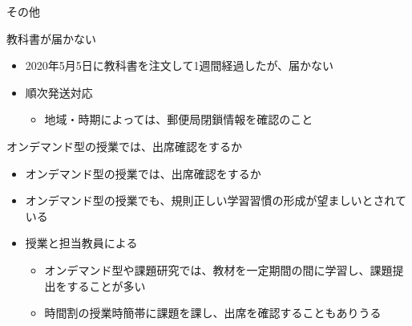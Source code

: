 \documentclass[a4j,10pt]{jsarticle}
\def\lthtmlcheckvsize{\ifdim\ht\sizebox<\vsize 
  \ifdim\wd\sizebox<\hsize\expandafter\hfill\fi \expandafter\vfill
  \else\expandafter\vss\fi}%
\begin{document}
{\newpage\clearpage
{}%
\begin{frame}[label={sec:org821c684},fragile]{その他}
\begin{block}{教科書が届かない}
\begin{itemize}
\item 2020年5月5日に教科書を注文して1週間経過したが、届かない
\item 順次発送対応
\begin{itemize}
\item 地域・時期によっては、郵便局閉鎖情報を確認のこと
\end{itemize}
\end{itemize}
\end{block}
\par
\begin{block}{オンデマンド型の授業では、出席確認をするか}
\begin{itemize}
\item オンデマンド型の授業では、出席確認をするか
\par
\item オンデマンド型の授業でも、規則正しい学習習慣の形成が望ましいとされている
\par
\item 授業と担当教員による
\begin{itemize}
\item オンデマンド型や課題研究では、教材を一定期間の間に学習し、課題提出をすることが多い
\item 時間割の授業時簡帯に課題を課し、出席を確認することもありうる
\end{itemize}
\end{itemize}
\end{block}
\end{frame}%
\lthtmlfigureZ
\lthtmlcheckvsize\clearpage}
\end{document}
